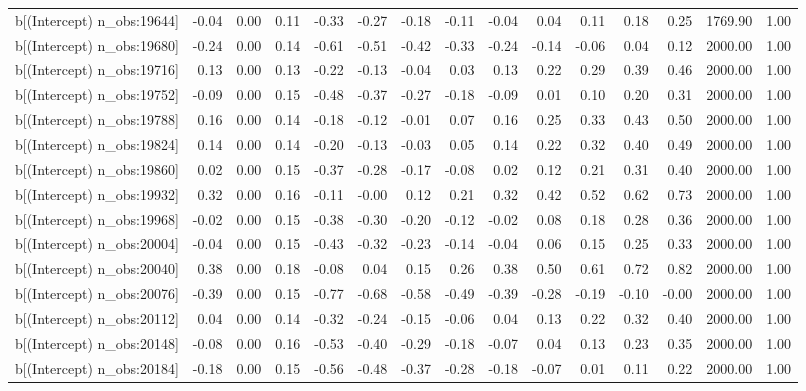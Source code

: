 \begin{table}[ht]
\begin{tabular}{rrrrrrrrrrrrrrr}
  b[(Intercept) n\_obs:19644] & -0.04 & 0.00 & 0.11 & -0.33 & -0.27 & -0.18 & -0.11 & -0.04 & 0.04 & 0.11 & 0.18 & 0.25 & 1769.90 & 1.00 \\ 
  b[(Intercept) n\_obs:19680] & -0.24 & 0.00 & 0.14 & -0.61 & -0.51 & -0.42 & -0.33 & -0.24 & -0.14 & -0.06 & 0.04 & 0.12 & 2000.00 & 1.00 \\ 
  b[(Intercept) n\_obs:19716] & 0.13 & 0.00 & 0.13 & -0.22 & -0.13 & -0.04 & 0.03 & 0.13 & 0.22 & 0.29 & 0.39 & 0.46 & 2000.00 & 1.00 \\ 
  b[(Intercept) n\_obs:19752] & -0.09 & 0.00 & 0.15 & -0.48 & -0.37 & -0.27 & -0.18 & -0.09 & 0.01 & 0.10 & 0.20 & 0.31 & 2000.00 & 1.00 \\ 
  b[(Intercept) n\_obs:19788] & 0.16 & 0.00 & 0.14 & -0.18 & -0.12 & -0.01 & 0.07 & 0.16 & 0.25 & 0.33 & 0.43 & 0.50 & 2000.00 & 1.00 \\ 
  b[(Intercept) n\_obs:19824] & 0.14 & 0.00 & 0.14 & -0.20 & -0.13 & -0.03 & 0.05 & 0.14 & 0.22 & 0.32 & 0.40 & 0.49 & 2000.00 & 1.00 \\ 
  b[(Intercept) n\_obs:19860] & 0.02 & 0.00 & 0.15 & -0.37 & -0.28 & -0.17 & -0.08 & 0.02 & 0.12 & 0.21 & 0.31 & 0.40 & 2000.00 & 1.00 \\ 
  b[(Intercept) n\_obs:19932] & 0.32 & 0.00 & 0.16 & -0.11 & -0.00 & 0.12 & 0.21 & 0.32 & 0.42 & 0.52 & 0.62 & 0.73 & 2000.00 & 1.00 \\ 
  b[(Intercept) n\_obs:19968] & -0.02 & 0.00 & 0.15 & -0.38 & -0.30 & -0.20 & -0.12 & -0.02 & 0.08 & 0.18 & 0.28 & 0.36 & 2000.00 & 1.00 \\ 
  b[(Intercept) n\_obs:20004] & -0.04 & 0.00 & 0.15 & -0.43 & -0.32 & -0.23 & -0.14 & -0.04 & 0.06 & 0.15 & 0.25 & 0.33 & 2000.00 & 1.00 \\ 
  b[(Intercept) n\_obs:20040] & 0.38 & 0.00 & 0.18 & -0.08 & 0.04 & 0.15 & 0.26 & 0.38 & 0.50 & 0.61 & 0.72 & 0.82 & 2000.00 & 1.00 \\ 
  b[(Intercept) n\_obs:20076] & -0.39 & 0.00 & 0.15 & -0.77 & -0.68 & -0.58 & -0.49 & -0.39 & -0.28 & -0.19 & -0.10 & -0.00 & 2000.00 & 1.00 \\ 
  b[(Intercept) n\_obs:20112] & 0.04 & 0.00 & 0.14 & -0.32 & -0.24 & -0.15 & -0.06 & 0.04 & 0.13 & 0.22 & 0.32 & 0.40 & 2000.00 & 1.00 \\ 
  b[(Intercept) n\_obs:20148] & -0.08 & 0.00 & 0.16 & -0.53 & -0.40 & -0.29 & -0.18 & -0.07 & 0.04 & 0.13 & 0.23 & 0.35 & 2000.00 & 1.00 \\ 
  b[(Intercept) n\_obs:20184] & -0.18 & 0.00 & 0.15 & -0.56 & -0.48 & -0.37 & -0.28 & -0.18 & -0.07 & 0.01 & 0.11 & 0.22 & 2000.00 & 1.00 \\ 

\end{tabular}
\end{table}
